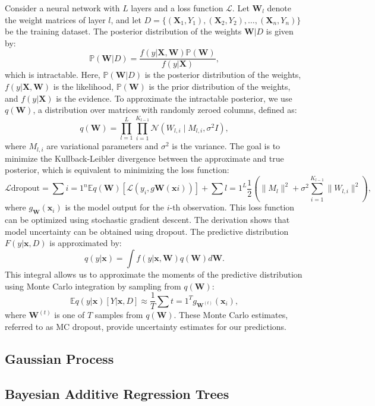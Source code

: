 Consider a neural network with $L$ layers and a loss function $\mathcal{L}$. Let $\mathbf{W}_l$ denote the weight matrices of layer $l$, and let $D = \{(\mathbf{X}_1, Y_1), (\mathbf{X}_2, Y_2), \ldots, (\mathbf{X}_n, Y_n)\}$ be the training dataset. The posterior distribution of the weights $\mathbf{W}|D$ is given by:
$$
\mathbb{P}(\mathbf{W}|D) = \frac{f(y|\mathbf{X}, \mathbf{W})\mathbb{P}(\mathbf{W})}{f(y|\mathbf{X})},
$$
which is intractable. Here, $\mathbb{P}(\mathbf{W}|D)$ is the posterior distribution of the weights, $f(y|\mathbf{X}, \mathbf{W})$ is the likelihood, $\mathbb{P}(\mathbf{W})$ is the prior distribution of the weights, and $f(y|\mathbf{X})$ is the evidence. To approximate the intractable posterior, we use $q(\mathbf{W})$, a distribution over matrices with randomly zeroed columns, defined as:
$$
q(\mathbf{W}) = \prod_{l=1}^{L} \prod_{i=1}^{K_{l-1}} \mathcal{N}(W_{l,i} \mid M_{l,i}, \sigma^2 I),
$$
where $M_{l,i}$ are variational parameters and $\sigma^2$ is the variance. The goal is to minimize the Kullback-Leibler divergence between the approximate and true posterior, which is equivalent to minimizing the loss function:
$$
\mathcal{L}{\text{dropout}} = \sum{i=1}^{n} \mathbb{E}{q(\mathbf{W})} [\mathcal{L}(y_i, g{\mathbf{W}}(\mathbf{x}i))] + \sum{l=1}^{L} \frac{1}{2} \left( \|M_l\|^2 + \sigma^2 \sum_{i=1}^{K_{l-1}} \|W_{l,i}\|^2 \right),
$$
where $g_{\mathbf{W}}(\mathbf{x}_i)$ is the model output for the $i$-th observation. This loss function can be optimized using stochastic gradient descent.
The derivation shows that model uncertainty can be obtained using dropout. The predictive distribution $F(y | \mathbf{x}, D)$ is approximated by:
$$
q(y| \mathbf{x}) = \int f(y| \mathbf{x}, \mathbf{W}) q(\mathbf{W}) d\mathbf{W}.
$$
This integral allows us to approximate the moments of the predictive distribution using Monte Carlo integration by sampling from $q(\mathbf{W})$:
$$
\mathbb{E}{q(y| \mathbf{x})}[Y | \mathbf{x}, D] \approx \frac{1}{T} \sum{t=1}^{T} g_{\mathbf{W}^{(t)}}(\mathbf{x}_i),
$$
where $\mathbf{W}^{(t)}$ is one of $T$ samples from $q(\mathbf{W})$. These Monte Carlo estimates, referred to as MC dropout, provide uncertainty estimates for our predictions.

\subsection{Gaussian Process}

\subsection{Bayesian Additive Regression Trees}

